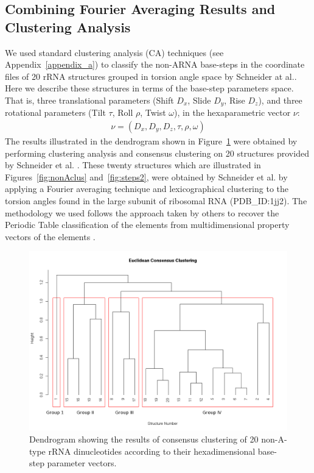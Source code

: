 \subsection{Combining Fourier Averaging Results and Clustering Analysis}
We   used   standard   clustering   analysis  (CA)   techniques   (see
Appendix~\ref{appendix_a}) to classify  the non-ARNA base-steps in the
coordinate files of 20 rRNA  structures grouped in torsion angle space
by  Schneider  at  al.\cite{schneider2004}.  Here  we  describe  these
structures in terms of the  base-step parameters space. That is, three
translational parameters  (Shift $D_x$, Slide $D_y$,  Rise $D_z$), and
three   rotational  parameters  (Tilt   $\tau$,  Roll   $\rho$,  Twist
$\omega$), in the hexaparametric vector $\nu$:
\begin{gather}
\nu = (D_x, D_y, D_z, \tau, \rho, \omega)
\end{gather}
The    results    illustrated    in    the   dendrogram    shown    in
Figure~\ref{fig:eucl_cons}  were  obtained  by  performing  clustering
analysis  and  consensus  clustering  on  20  structures  provided  by
Schneider et al.   \cite{schneider2004}. These twenty structures which
are  illustrated  in Figures~\ref{fig:nonAclus}  and~\ref{fig:steps2},
were  obtained by  Schneider et  al. by  applying a  Fourier averaging
technique and  lexicographical clustering to the  torsion angles found
in the large subunit of ribosomal RNA (PDB\_ID:1jj2).  The methodology
we used follows  the approach taken by others  to recover the Periodic
Table  classification of the  elements from  multidimensional property
vectors of the elements \cite{restrepo2004, restrepo2006}.
\begin{figure}[htbp]
 \centering
\includegraphics[angle=90, scale=0.6]{Chapter2/eucli_cons_nonA-RNA.png}
\caption{Dendrogram showing the results  of consensus clustering of 20
non-A-type  rRNA  dinucleotides   according  to  their  hexadimensional
base-step parameter vectors.}
 \label{fig:eucl_cons}
\end{figure}

